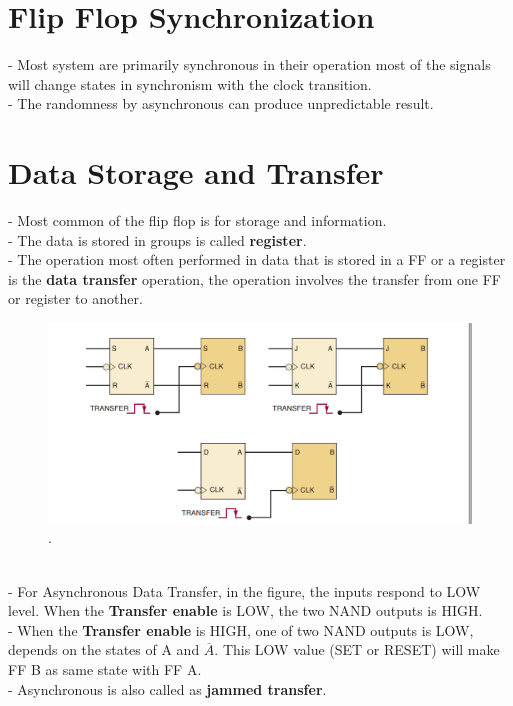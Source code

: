 \documentclass[12pt]{article}
\begin{document}
\section{Flip Flop Synchronization}
- Most system are primarily synchronous in their operation most of the signals will change states in synchronism with the clock transition. \\
- The randomness by asynchronous can produce unpredictable result.
\section{Data Storage and Transfer}
- Most common of the flip flop is for storage and information. \\
- The data is stored in groups is called \textbf{register}. \\
- The operation most often performed in data that is stored in a FF or a register is the \textbf{data transfer} operation, the operation involves the transfer from one FF or register to another. \\
\begin{figure}
\includegraphics[scale = 0.6]{hinh19}
\label{Synchronous Data Transfer of S-R, J-K, D flip flops}. \\
\end{figure}
\\
- For Asynchronous Data Transfer, in the figure, the inputs respond to LOW level. When the \textbf{Transfer enable} is LOW, the two NAND outputs is HIGH. \\
- When the \textbf{Transfer enable} is HIGH, one of two NAND outputs is LOW, depends on the states of A and $\overline{A}$. This LOW value (SET or RESET) will make FF B as same state with FF A. \\
- Asynchronous is also called as \textbf{jammed transfer}. \\
\end{document}
